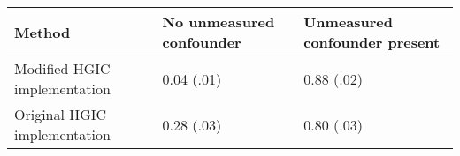 \begin{tabular}{lll}
\toprule
Method &  No unmeasured confounder & Unmeasured confounder present  \\
\midrule
Modified HGIC implementation & 0.04 (.01) & 0.88 (.02) \\
Original HGIC implementation & 0.28 (.03) & 0.80 (.03) \\ 
\bottomrule
\end{tabular}
